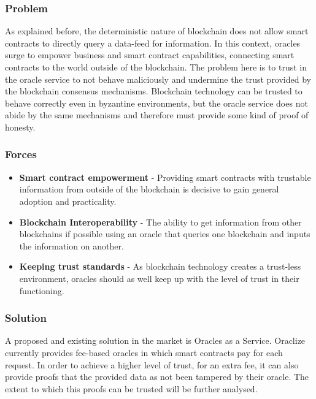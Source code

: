 \subsubsection{Problem}
As explained before, the deterministic nature of blockchain does not allow smart contracts to directly query a data-feed for information. In this context, oracles surge to empower business and smart contract capabilities, connecting smart contracts to the world outside of the blockchain. The problem here is to trust in the oracle service to not behave maliciously and undermine the trust provided by the blockchain consensus mechanisms. Blockchain technology can be trusted to behave correctly even in byzantine environments, but the oracle service does not abide by the same mechanisms and therefore must provide some kind of proof of honesty. 

\subsubsection{Forces}
\begin{itemize}
\item \textbf{Smart contract empowerment} - Providing smart contracts with trustable information from outside of the blockchain is decisive to gain general adoption and practicality.
\item \textbf{Blockchain Interoperability} - The ability to get information from other blockchains if possible using an oracle that queries one blockchain and inputs the information on another.
\item \textbf{Keeping trust standards} - As blockchain technology creates a trust-less environment, oracles should as well keep up with the level of trust in their functioning.
\end{itemize}


\subsubsection{Solution}
A proposed and existing solution in the market is Oracles as a Service. Oraclize  \cite{Oraclize.it2018OraclizeDocumentation} currently provides fee-based oracles in which smart contracts pay for each request. In order to achieve a higher level of trust, for an extra fee, it can also provide proofs that the provided data as not been tampered by their oracle. The extent to which this proofs can be trusted will be further analysed.

